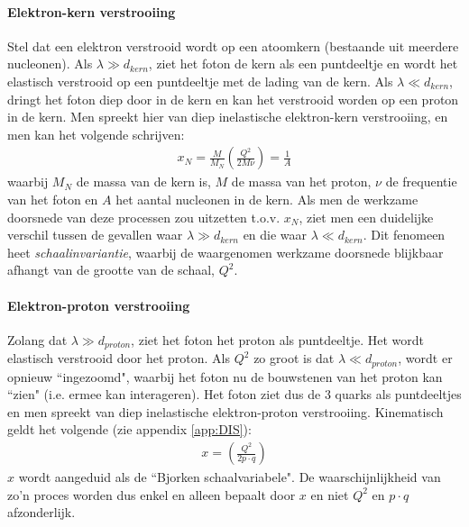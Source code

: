 \documentclass[a4paper,11pt]{article}
\numberwithin{equation}{section} %
\begin{document}
    \paragraph{Elektron-kern verstrooiing}
Stel dat een elektron verstrooid wordt op een atoomkern (bestaande uit meerdere nucleonen).
Als $\lambda \gg d_{kern}$, ziet het foton de kern als een puntdeeltje en wordt het elastisch verstrooid op een puntdeeltje met de lading van de kern.
Als $\lambda \ll d_{kern}$, dringt het foton diep door in de kern en kan het verstrooid worden op een proton in de kern.
Men spreekt hier van diep inelastische elektron-kern verstrooiing, en men kan het volgende schrijven:
\begin{align}
x_N = \frac{M}{M_N} \left( \frac{Q^2}{2M\nu} \right) = \frac{1}{A}
\end{align}
waarbij $M_N$ de massa van de kern is, $M$ de massa van het proton, $\nu$ de frequentie van het foton en $A$ het aantal nucleonen in de kern.
Als men de werkzame doorsnede van deze processen zou uitzetten t.o.v. $x_N$, ziet men een duidelijke verschil tussen de gevallen waar $\lambda \gg d_{kern}$ en die waar $\lambda \ll d_{kern}$.
Dit fenomeen heet \textit{schaalinvariantie}, waarbij de waargenomen werkzame doorsnede blijkbaar afhangt van de grootte van de schaal, $Q^2$.

      \paragraph{Elektron-proton verstrooiing}
Zolang dat $\lambda \gg d_{proton}$, ziet het foton het proton als puntdeeltje. Het wordt elastisch verstrooid door het proton.
Als $Q^2$ zo groot is dat $\lambda \ll d_{proton}$, wordt er opnieuw ``ingezoomd", waarbij het foton nu de bouwstenen van het proton kan ``zien" (i.e. ermee kan interageren).
Het foton ziet dus de 3 quarks als puntdeeltjes en men spreekt van diep inelastische elektron-proton verstrooiing.
Kinematisch geldt het volgende (zie appendix \ref{app:DIS}):
\begin{align} \label{eq:Bjorkenx}
x = \left( \frac{Q^2}{2p\cdot q} \right)
\end{align}
$x$ wordt aangeduid als de ``Bjorken schaalvariabele".
De waarschijnlijkheid van zo'n proces worden dus enkel en alleen bepaalt door $x$ en niet $Q^2$ en $p\cdot q$ afzonderlijk.
\end{document}
